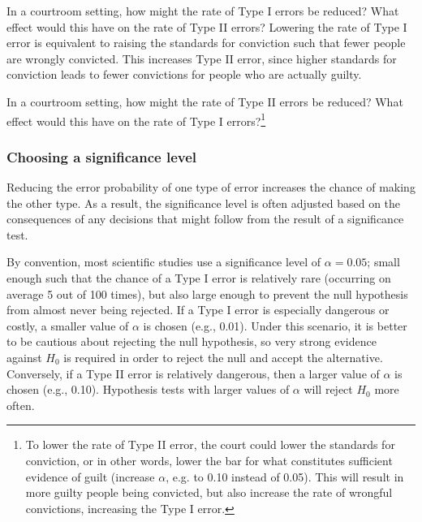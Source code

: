\begin{example}
{In a courtroom setting, how might the rate of Type I errors be reduced? What effect would this have on the rate of Type II errors?}	
Lowering the rate of Type I error is equivalent to raising the standards for conviction such that fewer people are wrongly convicted. This increases Type II error, since higher standards for conviction leads to fewer convictions for people who are actually guilty.
\end{example}


\begin{exercise} \label{howToReduceType2ErrorsInUSCourts}
	In a courtroom setting, how might the rate of Type II errors be reduced? What effect would this have on the rate of Type I errors?\footnote{To lower the rate of Type II error, the court could lower the standards for conviction, or in other words, lower the bar for what constitutes sufficient evidence of guilt (increase $\alpha$, e.g. to 0.10 instead of 0.05). This will result in more guilty people being convicted, but also increase the rate of wrongful convictions, increasing the Type I error.}
\end{exercise}


\subsubsection{Choosing a significance level}


Reducing the error probability of one type of error increases the chance of making the other type. As a result, the significance level is often adjusted based on the consequences of any decisions that might follow from the result of a significance test.

\label{significanceLevel}

By convention, most scientific studies use a significance level of $\alpha = 0.05$; small enough such that the chance of a Type I error is relatively rare (occurring on average 5 out of 100 times), but also large enough to prevent the null hypothesis from almost never being rejected. If a Type I error is especially dangerous or costly, a smaller value of $\alpha$ is chosen (e.g., 0.01). Under this scenario, it is better to be cautious about rejecting the null hypothesis, so very strong evidence against $H_0$ is required in order to reject the null and accept the alternative. Conversely, if a Type II error is relatively dangerous, then a larger value of $\alpha$ is chosen (e.g., 0.10). Hypothesis tests with larger values of $\alpha$ will reject $H_0$ more often.


